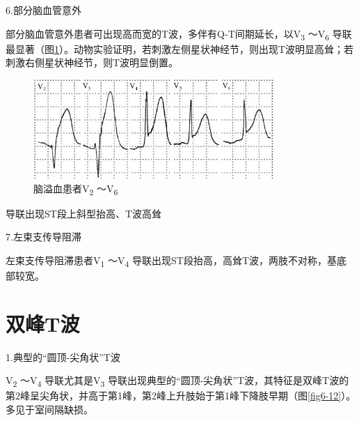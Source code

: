 6.部分脑血管意外

部分脑血管意外患者可出现高而宽的T波，多伴有Q-T间期延长，以V\textsubscript{3}
～V\textsubscript{6}
导联最显著（图\ref{fig6-11}）。动物实验证明，若刺激左侧星状神经节，则出现T波明显高耸；若刺激右侧星状神经节，则T波明显倒置。

\begin{figure}[!htbp]
 \centering
 \includegraphics[width=3.60417in,height=1.47917in]{./images/Image00103.jpg}
 \captionsetup{justification=centering}
 \caption{脑溢血患者V\textsubscript{2} ～V\textsubscript{6}}
 \label{fig6-11}
  \end{figure} 
导联出现ST段上斜型抬高、T波高耸

7.左束支传导阻滞

左束支传导阻滞患者V\textsubscript{1} ～V\textsubscript{4}
导联出现ST段抬高，高耸T波，两肢不对称，基底部较宽。

\protect\hypertarget{text00012.htmlux5cux23subid94}{}{}

\section{双峰T波}

1.典型的“圆顶-尖角状”T波

V\textsubscript{2} ～V\textsubscript{4} 导联尤其是V\textsubscript{3}
导联出现典型的“圆顶-尖角状”T波，其特征是双峰T波的第2峰呈尖角状，并高于第1峰，第2峰上升肢始于第1峰下降肢早期（图\ref{fig6-12}）。多见于室间隔缺损。

